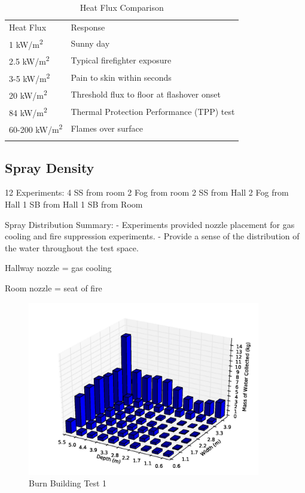 \documentclass[12pt,oneside]{book}
\begin{document}
\begin{table}
	\centering
	\caption{Heat Flux Comparison}
	\begin{tabular}{ll}
		\hline\noalign{\smallskip}
		Heat Flux	  				   & Response		\\
		\noalign{\smallskip}\hline\noalign{\smallskip}
		1 kW/m\textsuperscript{2}      & Sunny day      \\
		2.5 kW/m\textsuperscript{2}    & Typical firefighter exposure     \\
		3-5 kW/m\textsuperscript{2}    & Pain to skin within seconds      \\
		20 kW/m\textsuperscript{2}     & Threshold flux to floor at flashover onset    \\
		84 kW/m\textsuperscript{2}     & Thermal Protection Performance (TPP) test    \\
		60-200 kW/m\textsuperscript{2} & Flames over surface     \\
		\noalign{\smallskip}\hline
	\end{tabular}
	\label{tab:Heat_Flux_Comparison}
\end{table}

\subsection{Spray Density}
\label{subsec:Spray_Density}

12 Experiments:
4 SS from room
2 Fog from room
2 SS from Hall
2 Fog from Hall
1 SB from Hall
1 SB from Room

Spray Distribution Summary:
- Experiments provided nozzle placement for gas cooling and fire suppression experiments.
- Provide a sense of the distribution of the water throughout the test space.

Hallway nozzle = gas cooling

Room nozzle = seat of fire

\begin{figure}[!ht]
	\includegraphics[width=4in]{../Figures/Bars/BB1}
	\caption{Burn Building Test 1}
	\label{fig:Burn_Building_Test_1}
\end{figure}
\end{document}
